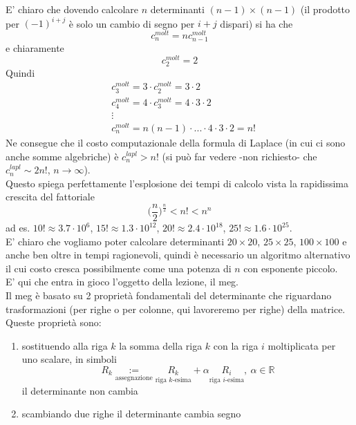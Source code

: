\documentclass[12pt,a4paper]{article}
\begin{document}
E' chiaro che dovendo calcolare $n$ determinanti $(n-1)\times (n-1)$ (il prodotto per $(-1)^{i+j}$ è solo un cambio di segno per $i+j$ dispari) si ha che 
\begin{equation*}
    c_n^{molt} = n c_{n-1}^{molt}
\end{equation*}
e chiaramente
\begin{equation*}
    c_2^{molt} = 2
\end{equation*}
Quindi
\begin{equation*}
    \begin{split}
        & c_3^{molt} = 3 \cdot c_2^{molt} = 3\cdot 2 \\
        & c_4^{molt} = 4 \cdot c_3^{molt} = 4\cdot 3\cdot 2 \\
        & \vdots \\
        & c_n^{molt} = n(n-1)\cdot ... \cdot 4\cdot 3\cdot 2 = n!
    \end{split}
\end{equation*}
Ne consegue che il costo computazionale della formula di Laplace (in cui ci sono anche somme algebriche) è $c_n^{lapl} > n!$ (si può far vedere -non richiesto- che $c_n^{lapl} \sim 2n!$, $n \to \infty$). \\
Questo spiega perfettamente l'esplosione dei tempi di calcolo vista la rapidissima crescita del fattoriale
\begin{equation*}
    \bigl( \frac{n}{2} \bigr)^ {\frac{n}{2}} < n! < n^n
\end{equation*}
ad es. $10! \approx 3.7 \cdot 10^6$, $15! \approx 1.3 \cdot 10^{12}$, $20! \approx 2.4 \cdot 10^{18}$, $25! \approx 1.6 \cdot 10^{25}$.\\
E' chiaro che vogliamo poter calcolare determinanti $20 \times 20$, $25 \times 25$, $100 \times 100$ e anche ben oltre in tempi ragionevoli, quindi è necessario un algoritmo alternativo il cui costo cresca possibilmente come una potenza di $n$ con esponente piccolo. \\
E' qui che entra in gioco l'oggetto della lezione, il meg. \\
Il meg è basato su 2 proprietà fondamentali del determinante che riguardano trasformazioni (per righe o per colonne, qui lavoreremo per righe) della matrice. \\
Queste proprietà sono:
\begin{enumerate}
    \item sostituendo alla riga $k$ la somma della riga $k$ con la riga $i$ moltiplicata per uno scalare, in simboli
    \begin{equation*}
        R_k \underset{\text{assegnazione}}{:=} \underset{\text{riga $k$-esima}}{R_k} + \alpha \underset{\text{riga $i$-esima}}{R_i}, \ \alpha \in \mathbb{R}
    \end{equation*}
    il determinante non cambia
    \item scambiando due righe il determinante cambia segno
\end{enumerate}
\end{document}
